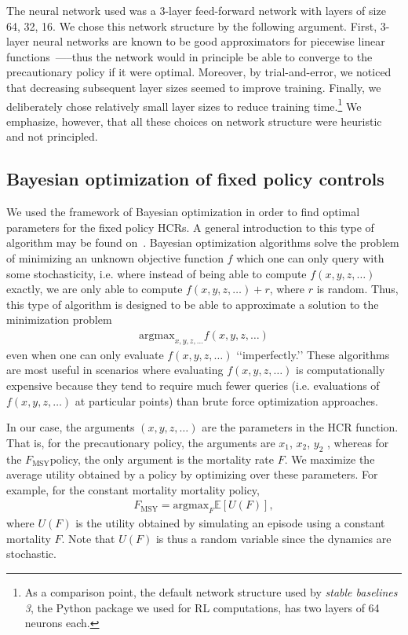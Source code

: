 \documentclass[floatfix,nofootinbib,longbibliography,notitlepage]{revtex4-2}
\def\textfmsy{$F_{\text{MSY}}$}
\def\fmsy{F_{\text{MSY}}}
\begin{document}
The neural network used was a 3-layer feed-forward network with layers of size 64, 32, 16. 
We chose this network structure by the following argument. 
First, 3-layer neural networks are known to be good approximators for piecewise linear functions~\cite{liang2016deep}—--thus the network would in principle be able to converge to the precautionary policy if it were optimal. 
Moreover, by trial-and-error, we noticed that decreasing subsequent layer sizes seemed to improve training. 
Finally, we deliberately chose relatively small layer sizes to reduce training time.\footnote{
As a comparison point, the default network structure used by \emph{stable baselines 3}, the Python package we used for RL computations, has two layers of 64 neurons each.
}
We emphasize, however, that all these choices on network structure were heuristic and not principled.

\subsection{Bayesian optimization of fixed policy controls}
\label{sec:bayesian}

We used the framework of Bayesian optimization in order to find optimal parameters for the fixed policy HCRs. 
A general introduction to this type of algorithm may be found on~\cite{frazier2018bayesian,head-skopt}. 
Bayesian optimization algorithms solve the problem of minimizing an unknown objective function $f$ which one can only query with some stochasticity, i.e. where instead of being able to compute $f(x, y, z, \dots)$ exactly, we are only able to compute $f(x, y, z, \dots)+r$, where $r$ is random. 
Thus, this type of algorithm is designed to be able to approximate a solution to the minimization problem
\begin{align}
    \mathrm{argmax}_{x,y,z,\dots} f(x,y,z,\dots)
\end{align}
even when one can only evaluate $f(x, y, z, \dots)$ ‘‘imperfectly.’’ 
These algorithms are most useful in scenarios where evaluating $f(x, y, z, \dots)$ is computationally expensive because they tend to require much fewer queries (i.e. evaluations of $f(x, y, z, \dots)$ at particular points) than brute force optimization approaches.

In our case, the arguments $(x, y, z, \dots)$ are the parameters in the HCR function. 
That is, for the precautionary policy, the arguments are $x_1$, $x_2$, $y_2$ , whereas for the \textfmsy policy, the only argument is the mortality rate $F$. 
We maximize the average utility obtained by a policy by optimizing over these parameters. 
For example, for the constant mortality mortality policy,
\begin{align}
    \fmsy = \mathrm{argmax}_F \mathbb{E}[U(F)],
\end{align}
where $U(F)$ is the utility obtained by simulating an episode using a constant mortality $F$. 
Note that $U(F)$ is thus a random variable since the dynamics are stochastic.
\end{document}
